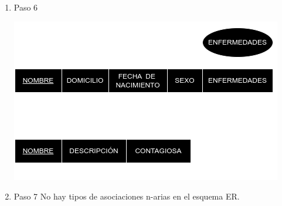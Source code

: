 \documentclass[a4paper,12pt]{article}
\begin{document}
\begin{enumerate}
  \item[] Paso 6
  
  \begin{center}
    \includegraphics[scale = .5]{IMA/E2P6.png}
  \end{center}

  \item[] Paso 7
  \thispagestyle{fancy} %
  No hay tipos de asociaciones n-arias en el esquema ER.

\end{enumerate}


\thispagestyle{fancy} %
\end{document}
